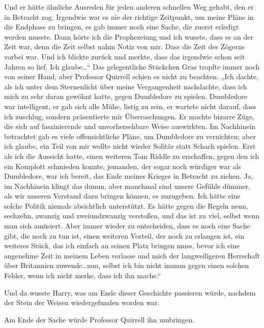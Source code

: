 Und er hätte ähnliche Ausreden für jeden anderen schnellen Weg gehabt, den er in Betracht zog. Irgendwie war es nie der richtige Zeitpunkt, um meine Pläne in die Endphase zu bringen, es gab immer noch eine Sache, die zuerst erledigt werden musste. Dann hörte ich die Prophezeiung und ich wusste, dass es an der Zeit war, denn die Zeit selbst nahm Notiz von mir. Dass die Zeit des Zögerns vorbei war. Und ich blickte zurück und merkte, dass das irgendwie schon seit Jahren so lief. Ich glaube…“
Das gelegentliche Stückchen Gras tropfte immer noch von seiner Hand, aber Professor Quirrell schien es nicht zu beachten.
„Ich dachte, als ich unter dem Sternenlicht über meine Vergangenheit nachdachte, dass ich mich zu sehr daran gewöhnt hatte, gegen Dumbledore zu spielen. Dumbledore war intelligent, er gab sich alle Mühe, listig zu sein, er wartete nicht darauf, dass ich zuschlug, sondern präsentierte mir Überraschungen. Er machte bizarre Züge, die sich auf faszinierende und unvorhersehbare Weise auswirkten. Im Nachhinein betrachtet gab es viele offensichtliche Pläne, um Dumbledore zu vernichten; aber ich glaube, ein Teil von mir wollte nicht wieder Solitär statt Schach spielen. Erst als ich die Aussicht hatte, einen weiteren Tom Riddle zu erschaffen, gegen den ich ein Komplott schmieden konnte, jemanden, der sogar noch würdiger war als Dumbledore, war ich bereit, das Ende meines Krieges in Betracht zu ziehen. Ja, im Nachhinein klingt das dumm, aber manchmal sind unsere Gefühle dümmer, als wir unseren Verstand dazu bringen können, es zuzugeben. Ich hätte eine solche Politik niemals absichtlich unterstützt. Es hätte gegen die Regeln neun, sechzehn, zwanzig und zweiundzwanzig verstoßen, und das ist zu viel, selbst wenn man sich amüsiert. Aber immer wieder zu entscheiden, dass es noch eine Sache gibt, die noch zu tun ist, einen weiteren Vorteil, der noch zu erlangen ist, ein weiteres Stück, das ich einfach an seinen Platz bringen muss, bevor ich eine angenehme Zeit in meinem Leben verlasse und mich der langweiligeren Herrschaft über Britannien zuwende…nun, selbst ich bin nicht immun gegen einen solchen Fehler, wenn ich nicht merke, dass ich ihn mache.“

Und da wusste Harry, was am Ende dieser Geschichte passieren würde, nachdem der Stein der Weisen wiedergefunden worden war.

Am Ende der Sache würde Professor Quirrell ihn umbringen.

